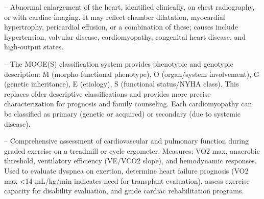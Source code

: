 -- Abnormal enlargement of the heart, identified clinically, on chest radiography, or with cardiac imaging. It may reflect chamber dilatation, myocardial hypertrophy, pericardial effusion, or a combination of these; causes include hypertension, valvular disease, cardiomyopathy, congenital heart disease, and high-output states.

-- The MOGE(S) classification system provides phenotypic and genotypic description: M (morpho-functional phenotype), O (organ/system involvement), G (genetic inheritance), E (etiology), S (functional status/NYHA class). This replaces older descriptive classifications and provides more precise characterization for prognosis and family counseling. Each cardiomyopathy can be classified as primary (genetic or acquired) or secondary (due to systemic disease).

-- Comprehensive assessment of cardiovascular and pulmonary function during graded exercise on a treadmill or cycle ergometer. Measures: VO2 max, anaerobic threshold, ventilatory efficiency (VE/VCO2 slope), and hemodynamic responses. Used to evaluate dyspnea on exertion, determine heart failure prognosis (VO2 max <14 mL/kg/min indicates need for transplant evaluation), assess exercise capacity for disability evaluation, and guide cardiac rehabilitation programs.

